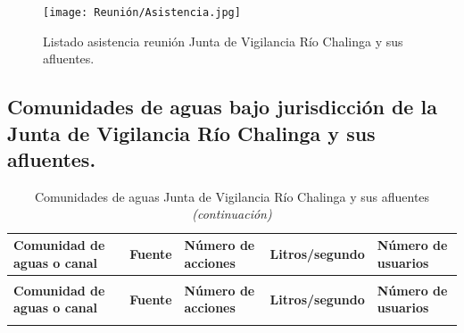 \documentclass[]{article}
\begin{document}
\begin{figure} [H]
	\texttt{[image: Reunión/Asistencia.jpg]}
	\caption{Listado asistencia reunión Junta de Vigilancia Río Chalinga y sus afluentes.}
\end{figure}

\newpage

\subsection{Comunidades de aguas bajo jurisdicción de la Junta de Vigilancia Río Chalinga y sus afluentes.} \label{canales chalinga}

\begin{longtable}{|p{4cm}|p{3cm}|p{2cm}|p{2.5cm}|p{2cm}|}
	\caption{Comunidades de aguas Junta de Vigilancia Río Chalinga y sus afluentes.}\\
	
	\hline
	\textbf{Comunidad de aguas o canal} & \textbf{Fuente} & \textbf{Número de acciones} & \textbf{Litros/segundo} & \textbf{Número de usuarios}\\
	\hline
	\endfirsthead
	
	\caption{Comunidades de aguas Junta de Vigilancia Río Chalinga y sus afluentes \emph{(continuación)}}\\
	\hline
	\textbf{Comunidad de aguas o canal} & \textbf{Fuente} & \textbf{Número de acciones} & \textbf{Litros/segundo} & \textbf{Número de usuarios}\\
	\hline
	\endhead
	
	\hline
	\endfoot
	
	\hline
	\endlastfoot    
	

\end{longtable}
\end{document}
